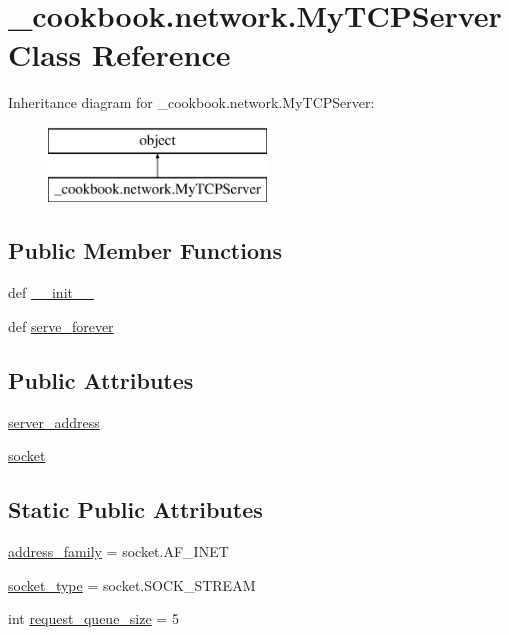 \hypertarget{class__cookbook_1_1network_1_1MyTCPServer}{\section{\-\_\-cookbook.\-network.\-My\-T\-C\-P\-Server Class Reference}
\label{class__cookbook_1_1network_1_1MyTCPServer}
}
Inheritance diagram for \-\_\-cookbook.\-network.\-My\-T\-C\-P\-Server\-:\begin{figure}[H]
\begin{center}
\leavevmode
\includegraphics[height=2.000000cm]{d1/dca/class__cookbook_1_1network_1_1MyTCPServer}
\end{center}
\end{figure}
\subsection*{Public Member Functions}
\begin{DoxyCompactItemize}
\item 
def \hyperlink{class__cookbook_1_1network_1_1MyTCPServer_ae4662fa1fa988f518ea3fecfeed42aeb}{\-\_\-\-\_\-init\-\_\-\-\_\-}
\item 
def \hyperlink{class__cookbook_1_1network_1_1MyTCPServer_a4881fd46726e14e995d3f69cc51edbad}{serve\-\_\-forever}
\end{DoxyCompactItemize}
\subsection*{Public Attributes}
\begin{DoxyCompactItemize}
\item 
\hyperlink{class__cookbook_1_1network_1_1MyTCPServer_a5d05dd8cc8114a343c9622b65340ee59}{server\-\_\-address}
\item 
\hyperlink{class__cookbook_1_1network_1_1MyTCPServer_a6ff2e7ff8e8cabc2ea5e57b0c03474b3}{socket}
\end{DoxyCompactItemize}
\subsection*{Static Public Attributes}
\begin{DoxyCompactItemize}
\item 
\hyperlink{class__cookbook_1_1network_1_1MyTCPServer_ae36e3c148d927eaa2a669fa4c2227e0a}{address\-\_\-family} = socket.\-A\-F\-\_\-\-I\-N\-E\-T
\item 
\hyperlink{class__cookbook_1_1network_1_1MyTCPServer_ae7f81da7d2ed969bf5df075b09850879}{socket\-\_\-type} = socket.\-S\-O\-C\-K\-\_\-\-S\-T\-R\-E\-A\-M
\item 
int \hyperlink{class__cookbook_1_1network_1_1MyTCPServer_af80f389b881aac1996ab9258d8507db0}{request\-\_\-queue\-\_\-size} = 5
\end{DoxyCompactItemize}
